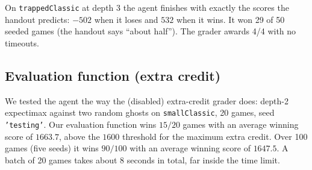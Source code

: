 On \texttt{trappedClassic} at depth 3 the agent finishes with exactly the scores the handout predicts: $-502$ when it
loses and $532$ when it wins. It won 29 of 50 seeded games (the handout says ``about half''). The grader awards 4/4 with no timeouts.

\subsection{Evaluation function (extra credit)}

We tested the agent the way the (disabled) extra-credit grader does: depth-2 expectimax against two random
ghosts on \texttt{smallClassic}, 20 games, seed \texttt{'testing'}. Our evaluation function wins $15/20$ games
with an average winning score of $1663.7$, above the $1600$ threshold for the maximum extra credit. Over 100
games (five seeds) it wins $90/100$ with an average winning score of $1647.5$. A batch of 20 games takes about
8 seconds in total, far inside the time limit.

